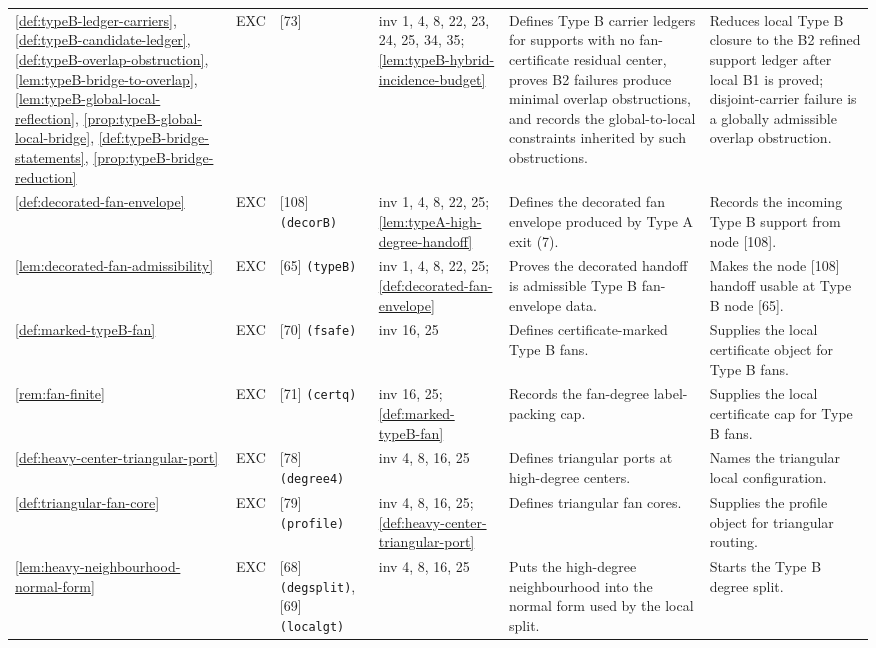 \documentclass[11pt]{article}
\begin{document}
{\begin{longtable}{L{0.10\textwidth} C{0.045\textwidth} L{0.13\textwidth} L{0.135\textwidth} L{0.28\textwidth} L{0.20\textwidth}}
\cref{def:typeB-ledger-carriers}, \cref{def:typeB-candidate-ledger}, \cref{def:typeB-overlap-obstruction}, \cref{lem:typeB-bridge-to-overlap}, \cref{lem:typeB-global-local-reflection}, \cref{prop:typeB-global-local-bridge}, \cref{def:typeB-bridge-statements}, \cref{prop:typeB-bridge-reduction} & EXC & [73] & inv 1, 4, 8, 22, 23, 24, 25, 34, 35; \cref{lem:typeB-hybrid-incidence-budget} & Defines Type B carrier ledgers for supports with no fan-certificate residual center, proves B2 failures produce minimal overlap obstructions, and records the global-to-local constraints inherited by such obstructions. & Reduces local Type B closure to the B2 refined support ledger after local B1 is proved; disjoint-carrier failure is a globally admissible overlap obstruction. \\
\cref{def:decorated-fan-envelope} & EXC & [108] \texttt{(decorB)} & inv 1, 4, 8, 22, 25; \cref{lem:typeA-high-degree-handoff} & Defines the decorated fan envelope produced by Type A exit (7). & Records the incoming Type B support from node [108]. \\
\cref{lem:decorated-fan-admissibility} & EXC & [65] \texttt{(typeB)} & inv 1, 4, 8, 22, 25; \cref{def:decorated-fan-envelope} & Proves the decorated handoff is admissible Type B fan-envelope data. & Makes the node [108] handoff usable at Type B node [65]. \\
\cref{def:marked-typeB-fan} & EXC & [70] \texttt{(fsafe)} & inv 16, 25 & Defines certificate-marked Type B fans. & Supplies the local certificate object for Type B fans. \\
\cref{rem:fan-finite} & EXC & [71] \texttt{(certq)} & inv 16, 25; \cref{def:marked-typeB-fan} & Records the fan-degree label-packing cap. & Supplies the local certificate cap for Type B fans. \\
\cref{def:heavy-center-triangular-port} & EXC & [78] \texttt{(degree4)} & inv 4, 8, 16, 25 & Defines triangular ports at high-degree centers. & Names the triangular local configuration. \\
\cref{def:triangular-fan-core} & EXC & [79] \texttt{(profile)} & inv 4, 8, 16, 25; \cref{def:heavy-center-triangular-port} & Defines triangular fan cores. & Supplies the profile object for triangular routing. \\
\cref{lem:heavy-neighbourhood-normal-form} & EXC & [68] \texttt{(degsplit)}, [69] \texttt{(localgt)} & inv 4, 8, 16, 25 & Puts the high-degree neighbourhood into the normal form used by the local split. & Starts the Type B degree split. \\

\end{longtable}}
\end{document}

